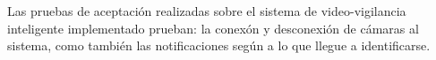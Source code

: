 Las pruebas de aceptación realizadas sobre el sistema de video-vigilancia inteligente implementado prueban: la conexón y desconexión de cámaras al sistema, como también las notificaciones según a lo que llegue a identificarse.

